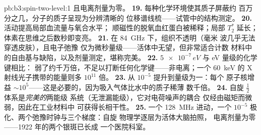 \begin{solution}{pb:b3:spin-two-level:1}
且电离剂量为零。
\textbf{19.} 每种化学环境使其质子屏蔽约
百万分之几，分子的质子呈现为分辨清晰的
位移谱线梳——试管中的结构测定。
\textbf{20.} 活动提高局部血流量与氧合水平；
顺磁性的脱氧血红蛋白被稀释；局部 $T_2^*$ 延长；
体素在思维之后数秒即变亮。
\textbf{21.} 在 \qty{84}{GHz} 下，组织不透明（毫米
波几乎无法穿透皮肤），且电子弛豫
仅为微秒量级——活体中无望，但非常适合计数
材料中的自由基与缺陷，以及剂量测定，堪称完美。
\textbf{22.} $\num{5e-7}\,\unit{eV}$ 与 eV 量级的化学键相比：
弱了约千万倍，不足以打断任何化学键——非电离；一个
\qty{60}{keV} 的 X 射线光子携带的能量则多 $10^{11}$ 倍。
\textbf{23.} 从 $10^{-5}$ 提升到量级为一：每个
原子核增益 $\sim10^5$——这是必要的，因为吸入气体比水中的质子稀薄
数千倍。
\textbf{24.} 自旋 $\tfrac12$ 体系是\emph{完美的}两能级
系统（无泄漏能级），它对电荷噪声的耦合
仅经由磁矩而微弱，因此在工业材料中
可获得长相干性。
\textbf{25.} 一个 \qty{128}{MHz} 进动，一个 $10^{-5}$
极化、两个弛豫时钟与三个梯度：自旋
物理学逐层为活体大脑拍照，
电离剂量为零——1922 年的两个银斑已长成
一个医院科室。
\end{solution}
